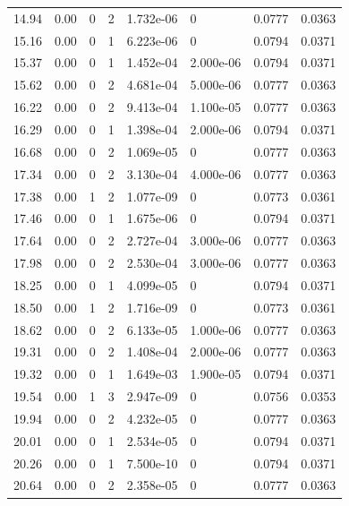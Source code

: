 \documentclass[preview]{standalone}
\begin{document}
{{{\begin{tabular}{L{1.2cm}C{1.2cm} C{0.3cm}C{0.5cm} C{1.4cm}C{1.4cm} C{1.4cm}C{1.4cm}}
  14.94  &  0.00  & 0     &  2 &  1.732e-06  & 0  & 0.0777 &  0.0363   \\ 
  15.16  &  0.00  & 0     &  1 &  6.223e-06  & 0  & 0.0794 &  0.0371   \\ 
  15.37  &  0.00  & 0     &  1 &  1.452e-04  & 2.000e-06  & 0.0794 &  0.0371   \\ 
  15.62  &  0.00  & 0     &  2 &  4.681e-04  & 5.000e-06  & 0.0777 &  0.0363   \\ 
  16.22  &  0.00  & 0     &  2 &  9.413e-04  & 1.100e-05  & 0.0777 &  0.0363   \\ 
  16.29  &  0.00  & 0     &  1 &  1.398e-04  & 2.000e-06  & 0.0794 &  0.0371   \\ 
  16.68  &  0.00  & 0     &  2 &  1.069e-05  & 0  & 0.0777 &  0.0363   \\ 
  17.34  &  0.00  & 0     &  2 &  3.130e-04  & 4.000e-06  & 0.0777 &  0.0363   \\ 
  17.38  &  0.00  & 1     &  2 &  1.077e-09  & 0  & 0.0773 &  0.0361   \\ 
  17.46  &  0.00  & 0     &  1 &  1.675e-06  & 0  & 0.0794 &  0.0371   \\ 
  17.64  &  0.00  & 0     &  2 &  2.727e-04  & 3.000e-06  & 0.0777 &  0.0363   \\ 
  17.98  &  0.00  & 0     &  2 &  2.530e-04  & 3.000e-06  & 0.0777 &  0.0363   \\ 
  18.25  &  0.00  & 0     &  1 &  4.099e-05  & 0  & 0.0794 &  0.0371   \\ 
  18.50  &  0.00  & 1     &  2 &  1.716e-09  & 0  & 0.0773 &  0.0361   \\ 
  18.62  &  0.00  & 0     &  2 &  6.133e-05  & 1.000e-06  & 0.0777 &  0.0363   \\ 
  19.31  &  0.00  & 0     &  2 &  1.408e-04  & 2.000e-06  & 0.0777 &  0.0363   \\ 
  19.32  &  0.00  & 0     &  1 &  1.649e-03  & 1.900e-05  & 0.0794 &  0.0371   \\ 
  19.54  &  0.00  & 1     &  3 &  2.947e-09  & 0  & 0.0756 &  0.0353   \\ 
  19.94  &  0.00  & 0     &  2 &  4.232e-05  & 0  & 0.0777 &  0.0363   \\ 
  20.01  &  0.00  & 0     &  1 &  2.534e-05  & 0  & 0.0794 &  0.0371   \\ 
  20.26  &  0.00  & 0     &  1 &  7.500e-10  & 0  & 0.0794 &  0.0371   \\ 
  20.64  &  0.00  & 0     &  2 &  2.358e-05  & 0  & 0.0777 &  0.0363   \\ 

\end{tabular}}}}
\end{document}
